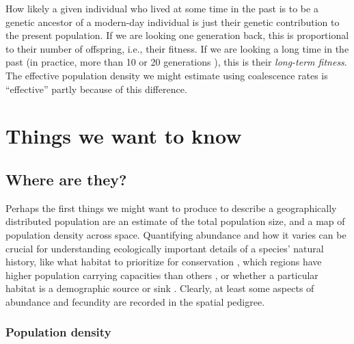 \documentclass{ar-1col}
\newcommand{\plr}[1]{{\color{green}{#1}}}
\newcommand{\todo}[1]{{\textbf{\color{red}{#1}}}}
\begin{document}
\plr{moved from below}
How likely a given individual who lived at some time in the past
is to be a genetic ancestor of a modern-day individual
is just their genetic contribution to the present population.
If we are looking one generation back, 
this is proportional to their number of offspring, i.e., their fitness.
If we are looking a long time in the past
(in practice, more than 10 or 20 generations \citep{BartonEtheridge2011fitness}),
this is their \textit{long-term fitness}.
The effective population density we might estimate using coalescence rates
is ``effective'' partly because of this difference.

\plr{note on differences between genetic and genealogical ancestry?}

\plr{tie up}

\section{Things we want to know}

\subsection{Where are they?}

Perhaps the first things we might want to produce
to describe a geographically distributed population
are an estimate of the total population size,
and a map of population density across space.
Quantifying abundance and how it varies
can be crucial for understanding
ecologically important details of a species' natural history,
like what habitat to prioritize for conservation \citep{zipkin2018synthesizing}, 
which regions have higher population carrying capacities than others \citep{roughgarden1974}, 
or whether a particular habitat is a demographic source or sink 
\citep{pulliam1988sources}.
Clearly, at least some aspects of abundance and fecundity are recorded in the spatial pedigree.

\subsubsection{Population density}

\todo{tidy up and tie together}
\end{document}
